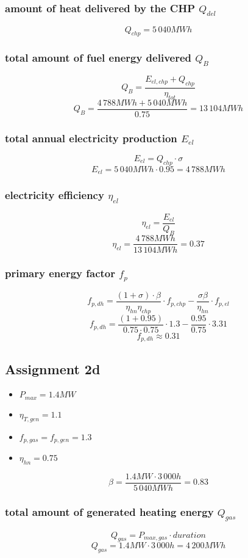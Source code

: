 \documentclass{article}
\begin{document}
		\subsubsection*{amount of heat delivered by the CHP $Q_{del}$}
			$$Q_{chp}=5\,040MWh$$
		\subsubsection*{total amount of fuel energy delivered $Q_B$}
			$$Q_B=\frac{E_{el,chp}+Q_{chp}}{\eta_{tot}}$$
			$$Q_B=\frac{4\,788MWh+5\,040MWh}{0.75}=13\,104MWh$$
		\subsubsection*{total annual electricity production $E_{el}$}
			$$E_{el}=Q_{chp}\cdot \sigma$$
			$$E_{el}=5\,040MWh\cdot 0.95=4\,788MWh$$
		\subsubsection*{electricity efficiency $\eta_{el}$}
			$$\eta_{el}=\frac{E_{el}}{Q_B}$$
			$$\eta_{el}=\frac{4\,788MWh}{13\,104MWh}=0.37$$
		\subsubsection*{primary energy factor $f_p$}
			$$f_{p,dh}=\frac{(1+\sigma)\cdot\beta}{\eta_{hn}\eta_{chp}}\cdot f_{p,chp}-\frac{\sigma\beta}{\eta_{hn}}\cdot f_{p,el}$$
			$$f_{p,dh}=\frac{(1+0.95)}{0.75\cdot 0.75}\cdot 1.3-\frac{0.95}{0.75}\cdot 3.31$$
			$$f_{p,dh}\approx 0.31$$

	\newpage
	\subsection*{Assignment 2d}
		\begin{itemize}
			\item $P_{max}=1.4MW$
			\item $\eta_{T,gen}=1.1$
			\item $f_{p,gas}=f_{p,gen}=1.3$
			\item $\eta_{hn}=0.75$
		\end{itemize}

		$$\beta=\frac{1.4MW\cdot 3\,000h}{5\,040MWh}=0.83$$

		\subsubsection*{total amount of generated heating energy $Q_{gas}$}
			$$Q_{gas}=P_{max,gas}\cdot duration$$
			$$Q_{gas}=1.4MW\cdot 3\,000h = 4\,200MWh$$
\end{document}
